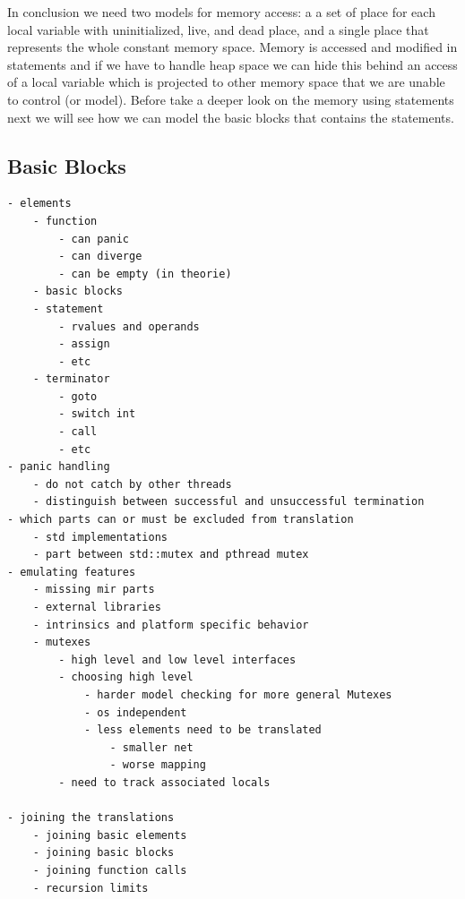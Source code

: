 In conclusion we need two models for memory access: a a set of place for each local variable with uninitialized, live, and dead place, and a single place that represents the whole constant memory space.
Memory is accessed and modified in statements and if we have to handle heap space we can hide this behind an access of a local variable which is projected to other memory space that we are unable to control (or model).
Before take a deeper look on the memory using statements next we will see how we can model the basic blocks that contains the statements.

\subsection{Basic Blocks}

\begin{verbatim}
- elements
    - function
        - can panic
        - can diverge
        - can be empty (in theorie)
    - basic blocks
    - statement
        - rvalues and operands
        - assign
        - etc
    - terminator
        - goto
        - switch int
        - call
        - etc
- panic handling
    - do not catch by other threads
    - distinguish between successful and unsuccessful termination
- which parts can or must be excluded from translation
    - std implementations
    - part between std::mutex and pthread mutex
- emulating features
    - missing mir parts
    - external libraries
    - intrinsics and platform specific behavior
    - mutexes
        - high level and low level interfaces
        - choosing high level
            - harder model checking for more general Mutexes
            - os independent
            - less elements need to be translated
                - smaller net
                - worse mapping
        - need to track associated locals

- joining the translations
    - joining basic elements
    - joining basic blocks
    - joining function calls
    - recursion limits
\end{verbatim}

